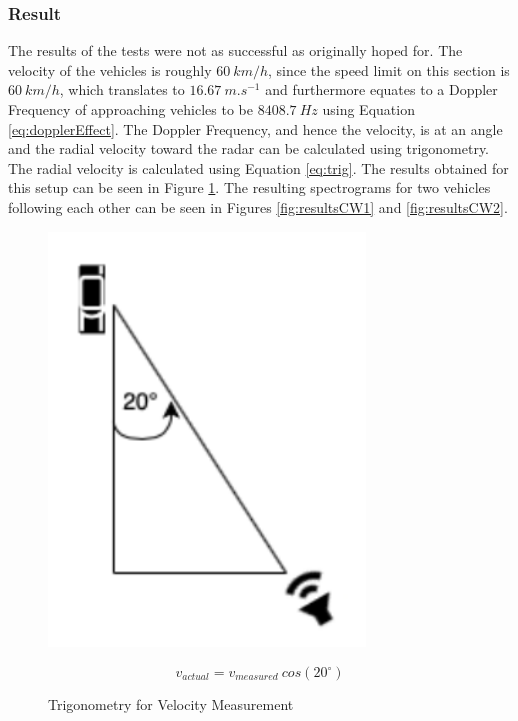 \subsubsection{Result}
The results of the tests were not as successful as originally hoped for. The velocity of the vehicles is roughly $60\ km/h$, since the speed limit on this section is $60\ km/h$, which translates to $16.67\ m.s^{-1}$ and furthermore equates to a Doppler Frequency of approaching vehicles to be $8408.7\ Hz$ using Equation \ref{eq:dopplerEffect}. The Doppler Frequency, and hence the velocity, is at an angle and the radial velocity toward the radar can be calculated using trigonometry. The radial velocity is calculated using Equation \ref{eq:trig}. The results obtained for this setup can be seen in Figure \ref{fig:trig}. The resulting spectrograms for two vehicles following each other can be seen in Figures \ref{fig:resultsCW1} and \ref{fig:resultsCW2}.

\begin{figure}[h!]
    \centering
    \begin{minipage}{0.45\textwidth}
        \centering
        \includegraphics[width=0.75\textwidth]{images/trig.pdf}
        \caption{Trigonometry for Velocity Measurement}\label{fig:trig}
    \end{minipage}
    \begin{minipage}{0.45\textwidth}
        \begin{equation}
        v_{actual} = v_{measured}\ cos(20^{\circ})\label{eq:trig}
        \end{equation}
    \end{minipage}\hfill
\end{figure}


